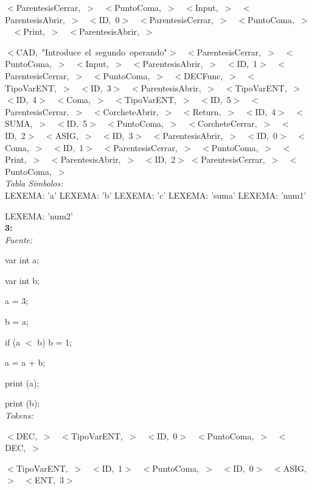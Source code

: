 \documentclass[a4paper, 12pt]{article}
\begin{document}
 \noindent
 \mbox{$<$ParentesisCerrar, $>$ }
 \mbox{$<$PuntoComa, $>$ }
 \mbox{$<$Input, $>$ }
 \mbox{$<$ParentesisAbrir, $>$ }
 \mbox{$<$ID, 0$>$ }
 \mbox{$<$ParentesisCerrar, $>$ }
 \mbox{$<$PuntoComa, $>$ }
 \mbox{$<$Print, $>$ }
 \mbox{$<$ParentesisAbrir, $>$ }
 
 \noindent
 \mbox{$<$CAD, \textnormal{"Introduce el segundo operando"}$>$ }
 \mbox{$<$ParentesisCerrar, $>$ }
 \mbox{$<$PuntoComa, $>$ }
 \mbox{$<$Input, $>$ }
 \mbox{$<$ParentesisAbrir, $>$ }
 \mbox{$<$ID, 1$>$ }
 \mbox{$<$ParentesisCerrar, $>$ }
 \mbox{$<$PuntoComa, $>$ }
 \mbox{$<$DECFunc, $>$ }
 \mbox{$<$TipoVarENT, $>$ }
 \mbox{$<$ID, 3$>$ }
 \mbox{$<$ParentesisAbrir, $>$ }
 \mbox{$<$TipoVarENT, $>$}
 \mbox{$<$ID, 4$>$ }
 \mbox{$<$Coma, $>$ }
 \mbox{$<$TipoVarENT, $>$ }
 \mbox{$<$ID, 5$>$ }
 \mbox{$<$ParentesisCerrar, $>$ }
 \mbox{$<$CorcheteAbrir, $>$ }
 \mbox{$<$Return, $>$ }
 \mbox{$<$ID, 4$>$ }
 \mbox{$<$SUMA, $>$ }
 \mbox{$<$ID, 5$>$ }
 \mbox{$<$PuntoComa, $>$ }
 \mbox{$<$CorcheteCerrar, $>$ }
 \mbox{$<$ID, 2$>$ }
 \mbox{$<$ASIG, $>$ }
 \mbox{$<$ID, 3$>$ }
 \mbox{$<$ParentesisAbrir, $>$ }
 \mbox{$<$ID, 0$>$ }
 \mbox{$<$Coma, $>$ }
 \mbox{$<$ID, 1$>$ }
 \mbox{$<$ParentesisCerrar, $>$ }
 \mbox{$<$PuntoComa, $>$ }
 \mbox{$<$Print, $>$ }
 \mbox{$<$ParentesisAbrir, $>$ }
 \mbox{$<$ID, 2$>$}
 \mbox{$<$ParentesisCerrar, $>$ }
 \mbox{$<$PuntoComa, $>$ }\medskip\\
\emph{Tabla Simbolos:}\\ 
  LEXEMA: 'a'
  LEXEMA: 'b'
  LEXEMA: 'c'
  LEXEMA: 'suma'
  LEXEMA: 'num1'
  
  \noindent
  LEXEMA: 'num2'\bigskip\\
 \textbf{3:}\medskip \\
 \emph{Fuente:}
 
 
var int a;

var int b;

a = 3;

b = a;

 if (a  $<$  b) b  =  1;
 
 a = a  +  b;
 
print (a);

print (b);
\medskip\\
\emph{Tokens:}

 \noindent
 \mbox{$<$DEC, $>$ }
 \mbox{$<$TipoVarENT, $>$ }
 \mbox{$<$ID, 0$>$ }
 \mbox{$<$PuntoComa, $>$ }
 \mbox{$<$DEC, $>$ }
 
 \noindent
 \mbox{$<$TipoVarENT, $>$ }
 \mbox{$<$ID, 1$>$ }
 \mbox{$<$PuntoComa, $>$ }
 \mbox{$<$ID, 0$>$ }
 \mbox{$<$ASIG, $>$ }
 \mbox{$<$ENT, 3$>$ }
 
\end{document}

